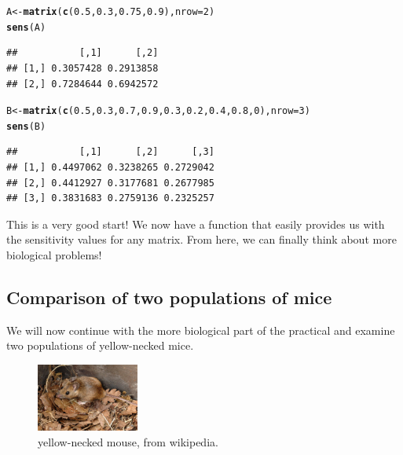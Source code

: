 \documentclass{article}\usepackage[]{graphicx}\usepackage[]{color}
\makeatletter
\newcommand{\hlnum}[1]{\textcolor[rgb]{0.686,0.059,0.569}{#1}}%
\newcommand{\hlstd}[1]{\textcolor[rgb]{0.345,0.345,0.345}{#1}}%
\newcommand{\hlkwb}[1]{\textcolor[rgb]{0.69,0.353,0.396}{#1}}%
\newcommand{\hlkwc}[1]{\textcolor[rgb]{0.333,0.667,0.333}{#1}}%
\newcommand{\hlkwd}[1]{\textcolor[rgb]{0.737,0.353,0.396}{\textbf{#1}}}%
\newenvironment{kframe}{%
 \def\at@end@of@kframe{}%
 \ifinner\ifhmode%
  \def\at@end@of@kframe{\end{minipage}}%
  \begin{minipage}{\columnwidth}%
 \fi\fi%
 \def\FrameCommand##1{\hskip\@totalleftmargin \hskip-\fboxsep
 \colorbox{shadecolor}{##1}\hskip-\fboxsep
     \hskip-\linewidth \hskip-\@totalleftmargin \hskip\columnwidth}%
 \MakeFramed {\advance\hsize-\width
   \@totalleftmargin\z@ \linewidth\hsize
   \@setminipage}}%
 {\par\unskip\endMakeFramed%
 \at@end@of@kframe}
\newenvironment{knitrout}{}{} %
\makeatother
\begin{document}
\begin{knitrout}
\color{fgcolor}\begin{kframe}
\begin{alltt}
\hlstd{A} \hlkwb{<-} \hlkwd{matrix}\hlstd{(}\hlkwd{c}\hlstd{(}\hlnum{0.5}\hlstd{,}\hlnum{0.3}\hlstd{,}\hlnum{0.75}\hlstd{,}\hlnum{0.9}\hlstd{),}\hlkwc{nrow}\hlstd{=}\hlnum{2}\hlstd{)}
\hlkwd{sens}\hlstd{(A)}
\end{alltt}
\begin{verbatim}
##           [,1]      [,2]
## [1,] 0.3057428 0.2913858
## [2,] 0.7284644 0.6942572
\end{verbatim}
\begin{alltt}
\hlstd{B} \hlkwb{<-} \hlkwd{matrix}\hlstd{(}\hlkwd{c}\hlstd{(}\hlnum{0.5}\hlstd{,}\hlnum{0.3}\hlstd{,}\hlnum{0.7}\hlstd{,}\hlnum{0.9}\hlstd{,}\hlnum{0.3}\hlstd{,}\hlnum{0.2}\hlstd{,}\hlnum{0.4}\hlstd{,}\hlnum{0.8}\hlstd{,}\hlnum{0}\hlstd{),}\hlkwc{nrow}\hlstd{=}\hlnum{3}\hlstd{)}
\hlkwd{sens}\hlstd{(B)}
\end{alltt}
\begin{verbatim}
##           [,1]      [,2]      [,3]
## [1,] 0.4497062 0.3238265 0.2729042
## [2,] 0.4412927 0.3177681 0.2677985
## [3,] 0.3831683 0.2759136 0.2325257
\end{verbatim}
\end{kframe}
\end{knitrout}
This is a very good start! We now have a function that easily provides us with the sensitivity values for any matrix. From here, we can finally think about more biological problems!
\subsection{Comparison of two populations of mice}
We will now continue with the more biological part of the practical and examine two populations of yellow-necked mice. 

\begin{figure}[h]
\centering
\includegraphics[width=0.3\textwidth]{mouse.jpg}
\caption{\label{fig:mice}yellow-necked mouse, from wikipedia.}
\end{figure}
\end{document}
